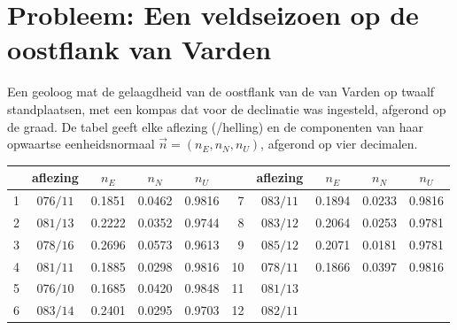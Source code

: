 \section{Probleem: Een veldseizoen op de oostflank van Varden}

\begin{problem}
\label{pb:b1:field-lab-methods-1:1}
Een geoloog mat de gelaagdheid van de oostflank van de  van Varden op twaalf standplaatsen, met een
kompas dat voor de declinatie was ingesteld, afgerond op de graad. De tabel geeft elke aflezing
(/helling) en de componenten van haar opwaartse eenheidsnormaal $\vec n = (n_E, n_N, n_U)$, afgerond op
vier decimalen.
\begin{center}
\small
\begin{tabular}{rcccc@{\qquad}rcccc}
\hline
 & aflezing & $n_E$ & $n_N$ & $n_U$ & & aflezing & $n_E$ & $n_N$ & $n_U$ \\
\hline
1 & $076/11$ & 0.1851 & 0.0462 & 0.9816 & 7 & $083/11$ & 0.1894 & 0.0233 & 0.9816 \\
2 & $081/13$ & 0.2222 & 0.0352 & 0.9744 & 8 & $083/12$ & 0.2064 & 0.0253 & 0.9781 \\
3 & $078/16$ & 0.2696 & 0.0573 & 0.9613 & 9 & $085/12$ & 0.2071 & 0.0181 & 0.9781 \\
4 & $081/11$ & 0.1885 & 0.0298 & 0.9816 & 10 & $078/11$ & 0.1866 & 0.0397 & 0.9816 \\
5 & $076/10$ & 0.1685 & 0.0420 & 0.9848 & 11 & $081/13$ & & & \\
6 & $083/14$ & 0.2401 & 0.0295 & 0.9703 & 12 & $082/11$ & & & \\
\hline
\end{tabular}
\end{center}


\end{problem}
